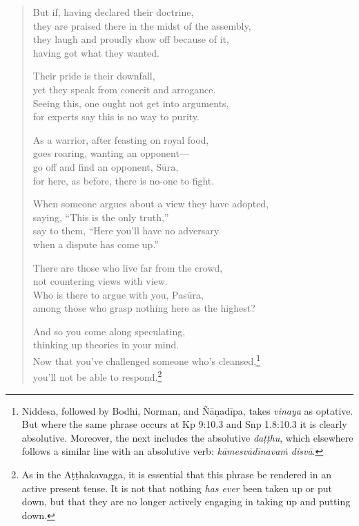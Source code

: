 \documentclass[12pt,openany]{book}%
\begin{document}
\begin{verse}
But if, having declared their doctrine, \\
they are praised there in the midst of the assembly, \\
they laugh and proudly show off because of it, \\
having got what they wanted. 

Their pride is their downfall, \\
yet they speak from conceit and arrogance. \\
Seeing this, one ought not get into arguments, \\
for experts say this is no way to purity. 

As a warrior, after feasting on royal food, \\
goes roaring, wanting an opponent—\\
go off and find an opponent, \textsanskrit{Sūra}, \\
for here, as before, there is no-one to fight. 

When someone argues about a view they have adopted, \\
saying, “This is the only truth,” \\
say to them, “Here you’ll have no adversary \\
when a dispute has come up.” 

There are those who live far from the crowd, \\
not countering views with view. \\
Who is there to argue with you, \textsanskrit{Pasūra}, \\
among those who grasp nothing here as the highest? 

And so you come along speculating, \\
thinking up theories in your mind. \\
Now that you’ve challenged someone who’s cleansed,\footnote{Niddesa, followed by Bodhi, Norman, and \textsanskrit{Ñāṇadīpa}, takes \textit{vinaya} as optative. But where the same phrase occurs at Kp 9:10.3 and Snp 1.8:10.3 it is clearly absolutive. Moreover, the next includes the absolutive \textit{\textsanskrit{daṭṭhu}}, which elsewhere follows a similar line with an absolutive verb: \textit{\textsanskrit{kāmesvādīnavaṁ} \textsanskrit{disvā}}. } \\
you’ll not be able to respond.\footnote{As in the \textsanskrit{Aṭṭhakavagga}, it is essential that this phrase be rendered in an active present tense. It is not that nothing \emph{has ever} been taken up or put down, but that they are no longer actively engaging in taking up and putting down. } 

%
\end{verse}
\end{document}
